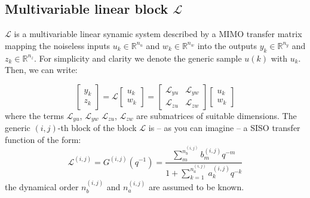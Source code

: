 \noindent
\subsection{Multivariable linear block $\mathcal{L}$}
$\mathcal{L}$ is a multivariable linear synamic system described by a MIMO transfer matrix mapping the noiseless inputs $u_k\in\mathbb{R}^{n_u}$ and $w_k\in\mathbb{R}^{n_w}$ into the outputs $y_k\in\mathbb{R}^{n_y}$ and $z_k\in\mathbb{R}^{n_z}$. For simplicity and clarity we denote the generic sample $u(k)$ with $u_k$. Then, we can write:

\begin{equation}
    \begin{bmatrix}
        y_k\\z_k
    \end{bmatrix}=\mathcal{L}\begin{bmatrix}
        u_k\\w_k
    \end{bmatrix}=\begin{bmatrix}
        \mathcal{L}_{yu}&\mathcal{L}_{yw}\\
        \mathcal{L}_{zu}&\mathcal{L}_{zw}
    \end{bmatrix}\begin{bmatrix}
        u_k\\w_k
    \end{bmatrix}
\end{equation}
\noindent
where the terms  $\mathcal{L}_{yu}$, $\mathcal{L}_{yw}$
$\mathcal{L}_{zu}$, $\mathcal{L}_{zw}$ are submatrices of suitable dimensions. The generic $(i,j)$-th block of the block $\mathcal{L}$ is -- as you can imagine -- a SISO transfer function of the form: 
\begin{equation}
    \mathcal{L}^{(i,j)}=G^{(i,j)}(q^{-1})=
    \frac{
        \sum_m^{n_b^{(i,j)}}{b_m^{(i,j)}q^{-m}}
    }
    {
        1+\sum_{k=1}^{n_a^{(i,j)}}{
            a_k^{(i,j)}q^{-k}
        }
    }
\end{equation}
the dynamical order $n_b^{(i,j)}$ and $n_a^{(i,j)}$ are assumed to be known.


